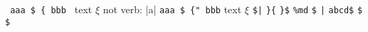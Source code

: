 \verb| aaa $ { bbb | text $\xi$ not verb: |a|
\verb|aaa $ {" bbb| text $\xi$
\verb!$|!
\verb=}{=
\verb"}$"
\verb|%md|
\verb*|$|
\verb$|$
\verb-abcd$-
\lstinline|$|
\lstinline{$}